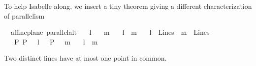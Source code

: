\begin{isabellebody}
%
\begin{isamarkuptext}%
\spike To help Isabelle along, we insert a tiny theorem giving a different 
characterization of parallelism \done%
\end{isamarkuptext}\isamarkuptrue%
\isamarkupfalse%
\ {\isacharparenleft}{\kern0pt}\ affine{\isacharunderscore}{\kern0pt}plane{\isacharparenright}{\kern0pt}\ parallel{\isacharunderscore}{\kern0pt}alt{\isacharcolon}{\kern0pt}\isanewline
\ \ \ l\isanewline
\ \ \ m\isanewline
\ \ \ {\isachardoublequoteopen}l\ {\isasymnoteq}\ m{\isachardoublequoteclose}\isanewline
\ \ \ {\isachardoublequoteopen}l\ {\isasymin}\ Lines{\isachardoublequoteclose}\ \ {\isachardoublequoteopen}m\ {\isasymin}\ Lines{\isachardoublequoteclose}\isanewline
\ \ \ {\isachardoublequoteopen}{\isasymforall}P{\isachardot}{\kern0pt}\ {\isacharparenleft}{\kern0pt}{\isasymnot}P\ {\isasymlhd}\ \ l{\isacharparenright}{\kern0pt}\ {\isasymor}\ {\isacharparenleft}{\kern0pt}{\isasymnot}\ P\ {\isasymlhd}\ \ m{\isacharparenright}{\kern0pt}{\isachardoublequoteclose}\isanewline
\ \ \ {\isachardoublequoteopen}l\ {\isacharbar}{\kern0pt}{\isacharbar}{\kern0pt}\ m{\isachardoublequoteclose}\isanewline
%
\isadelimproof
\ \ %
\endisadelimproof
%
\isatagproof
{}\isamarkupfalse%
%
\endisatagproof
{\isafoldproof}%
%
\isadelimproof
%
\endisadelimproof
%
\begin{isamarkuptext}%
\begin{hartshorne}
\prop[1.2] Two distinct lines have at most one point in common.


\end{hartshorne}
\end{isamarkuptext}
\end{isabellebody}

